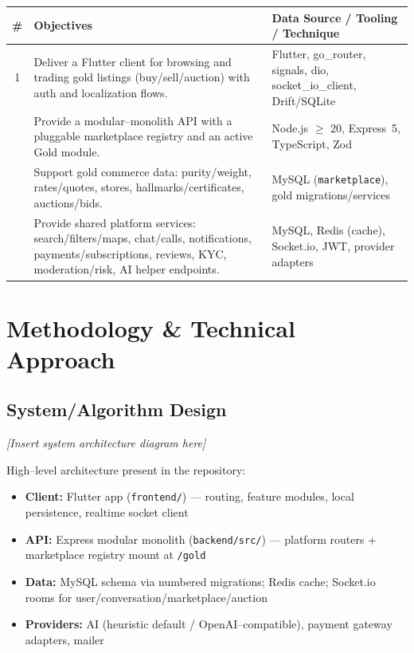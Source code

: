 \documentclass[11pt,a4paper]{article}
\begin{document}
\begin{tabularx}{\textwidth}{@{}c >{\raggedright\arraybackslash}X >{\raggedright\arraybackslash}X@{}}
\toprule
\textbf{\#} & \textbf{Objectives} & \textbf{Data Source / Tooling / Technique} \\
\midrule
1 & Deliver a Flutter client for browsing and trading gold listings
  (buy/sell/auction) with auth and localization flows.
  & Flutter, go\_router, signals, dio, socket\_io\_client, Drift/SQLite \\
\addlinespace
2 & Provide a modular--monolith API with a pluggable marketplace registry and
  an active Gold module.
  & Node.js $\geq$ 20, Express~5, TypeScript, Zod \\
\addlinespace
3 & Support gold commerce data: purity/weight, rates/quotes, stores,
  hallmarks/certificates, auctions/bids.
  & MySQL (\texttt{marketplace}), gold migrations/services \\
\addlinespace
4 & Provide shared platform services: search/filters/maps, chat/calls,
  notifications, payments/subscriptions, reviews, KYC, moderation/risk,
  AI helper endpoints.
  & MySQL, Redis (cache), Socket.io, JWT, provider adapters \\
\bottomrule
\end{tabularx}

\section{Methodology \& Technical Approach}

\subsection{System/Algorithm Design}

\textit{[Insert system architecture diagram here]}

High--level architecture present in the repository:
\begin{itemize}[leftmargin=1.4em]
  \item \textbf{Client:} Flutter app (\texttt{frontend/}) --- routing, feature
        modules, local persistence, realtime socket client
  \item \textbf{API:} Express modular monolith (\texttt{backend/src/}) ---
        platform routers + marketplace registry mount at \texttt{/gold}
  \item \textbf{Data:} MySQL schema via numbered migrations; Redis cache;
        Socket.io rooms for user/conversation/marketplace/auction
  \item \textbf{Providers:} AI (heuristic default / OpenAI--compatible),
        payment gateway adapters, mailer
\end{itemize}
\end{document}
